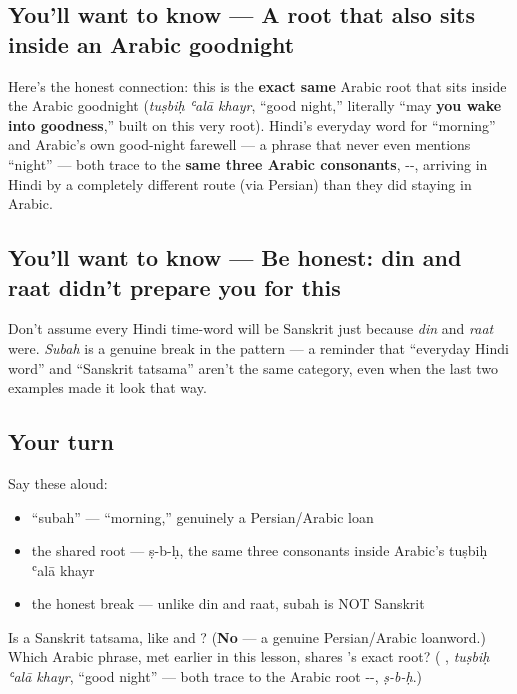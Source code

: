 \subsection*{You'll want to know — A root that also sits inside an Arabic goodnight}
Here's the honest connection: this is the \textbf{exact same} Arabic root that sits inside the Arabic goodnight \textbf{  } (\emph{tuṣbiḥ ʿalā khayr}, \textquotedblleft{}good night,\textquotedblright{} literally \textquotedblleft{}may \textbf{you wake into goodness},\textquotedblright{} built on this very root). Hindi's everyday word for \textquotedblleft{}morning\textquotedblright{} and Arabic's own good-night farewell — a phrase that never even mentions \textquotedblleft{}night\textquotedblright{} — both trace to the \textbf{same three Arabic consonants}, --, arriving in Hindi by a completely different route (via Persian) than they did staying in Arabic.

\subsection*{You'll want to know — Be honest: din and raat didn't prepare you for this}
Don't assume every Hindi time-word will be Sanskrit just because \emph{din} and \emph{raat} were. \emph{Subah} is a genuine break in the pattern — a reminder that \textquotedblleft{}everyday Hindi word\textquotedblright{} and \textquotedblleft{}Sanskrit tatsama\textquotedblright{} aren't the same category, even when the last two examples made it look that way.

\subsection*{Your turn}
Say these aloud:

\begin{itemize}
\raggedright
  \item \textquotedblleft{}subah\textquotedblright{} — \textquotedblleft{}morning,\textquotedblright{} genuinely a Persian/Arabic loan
  \item the shared root — ṣ-b-ḥ, the same three consonants inside Arabic's tuṣbiḥ ʿalā khayr
  \item the honest break — unlike din and raat, subah is NOT Sanskrit
\end{itemize}

\begin{tcolorbox}[breakable,colback=teal!4,colframe=teal!35!black,title={Before you move on}]
Is  a Sanskrit tatsama, like  and ? (\textbf{No} — a genuine Persian/Arabic loanword.) Which Arabic phrase, met earlier in this lesson, shares 's exact root? (\textbf{  }, \emph{tuṣbiḥ ʿalā khayr}, \textquotedblleft{}good night\textquotedblright{} — both trace to the Arabic root --, \emph{ṣ-b-ḥ}.)
\end{tcolorbox}
